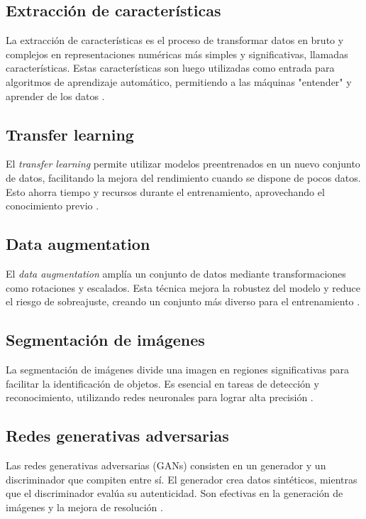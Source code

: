 \subsection{Extracción de características}
La extracción de características es el proceso de transformar datos en bruto y complejos en representaciones numéricas más simples y significativas, llamadas características. Estas características son luego utilizadas como entrada para algoritmos de aprendizaje automático, permitiendo a las máquinas "entender" y aprender de los datos \parencite{szeliski2010computervision}.

\subsection{Transfer learning}
El \textit{transfer learning} permite utilizar modelos preentrenados en un nuevo conjunto de datos, facilitando la mejora del rendimiento cuando se dispone de pocos datos. Esto ahorra tiempo y recursos durante el entrenamiento, aprovechando el conocimiento previo \parencite{pan2010survey}.

\subsection{Data augmentation}
El \textit{data augmentation} amplía un conjunto de datos mediante transformaciones como rotaciones y escalados. Esta técnica mejora la robustez del modelo y reduce el riesgo de sobreajuste, creando un conjunto más diverso para el entrenamiento \parencite{shorten2019survey}.

\subsection{Segmentación de imágenes}
La segmentación de imágenes divide una imagen en regiones significativas para facilitar la identificación de objetos. Es esencial en tareas de detección y reconocimiento, utilizando redes neuronales para lograr alta precisión \parencite{litjens2017deeplearningmedical}.

\subsection{Redes generativas adversarias}
Las redes generativas adversarias (GANs) consisten en un generador y un discriminador que compiten entre sí. El generador crea datos sintéticos, mientras que el discriminador evalúa su autenticidad. Son efectivas en la generación de imágenes y la mejora de resolución \parencite{goodfellow2014generative}.

